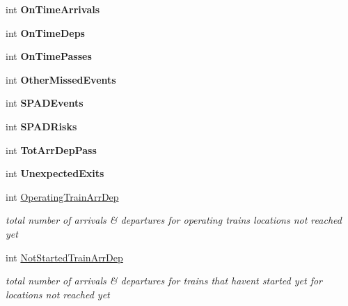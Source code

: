\begin{DoxyCompactItemize}
int {\bfseries On\+Time\+Arrivals}
\item 
\mbox{\label{class_t_train_controller_aa523bb158234e4dfd86c196c36e59fdd}} 
int {\bfseries On\+Time\+Deps}
\item 
\mbox{\label{class_t_train_controller_a3498a167993b7da117ec243defb56ab4}} 
int {\bfseries On\+Time\+Passes}
\item 
\mbox{\label{class_t_train_controller_ac4449f3490e36190d510f6960191ce45}} 
int {\bfseries Other\+Missed\+Events}
\item 
\mbox{\label{class_t_train_controller_a273080615512d3a32b82a881af9dc5fb}} 
int {\bfseries S\+P\+A\+D\+Events}
\item 
\mbox{\label{class_t_train_controller_a5d93cb7e73c061071656b8fbd6bbfc72}} 
int {\bfseries S\+P\+A\+D\+Risks}
\item 
\mbox{\label{class_t_train_controller_a6bfae23b356d4450b4d93d863d876f57}} 
int {\bfseries Tot\+Arr\+Dep\+Pass}
\item 
\mbox{\label{class_t_train_controller_af64a32b0811b647196f8d25ac6701ddc}} 
int {\bfseries Unexpected\+Exits}
\item 
\mbox{\label{class_t_train_controller_a9b419c5f86d0815c35093bf3c25c6821}} 
int \mbox{\hyperlink{class_t_train_controller_a9b419c5f86d0815c35093bf3c25c6821}{Operating\+Train\+Arr\+Dep}}
\begin{DoxyCompactList}\small\item\em total number of arrivals \& departures for operating trains locations not reached yet \end{DoxyCompactList}\item 
\mbox{\label{class_t_train_controller_aa547b8fba4e19683055e67359d41a933}} 
int \mbox{\hyperlink{class_t_train_controller_aa547b8fba4e19683055e67359d41a933}{Not\+Started\+Train\+Arr\+Dep}}
\begin{DoxyCompactList}\small\item\em total number of arrivals \& departures for trains that haven\textquotesingle{}t started yet for locations not reached yet \end{DoxyCompactList}\item 

\end{DoxyCompactItemize}
